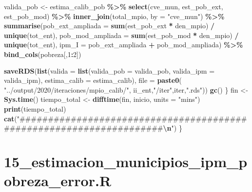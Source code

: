 \documentclass[
  12pt,
]{book}
\newenvironment{Shaded}{\begin{snugshade}}{\end{snugshade}}
\newcommand{\AttributeTok}[1]{\textcolor[rgb]{0.13,0.29,0.53}{#1}}
\newcommand{\DecValTok}[1]{\textcolor[rgb]{0.00,0.00,0.81}{#1}}
\newcommand{\FunctionTok}[1]{\textcolor[rgb]{0.13,0.29,0.53}{\textbf{#1}}}
\newcommand{\NormalTok}[1]{#1}
\newcommand{\OtherTok}[1]{\textcolor[rgb]{0.56,0.35,0.01}{#1}}
\newcommand{\SpecialCharTok}[1]{\textcolor[rgb]{0.81,0.36,0.00}{\textbf{#1}}}
\newcommand{\StringTok}[1]{\textcolor[rgb]{0.31,0.60,0.02}{#1}}
\begin{document}
\begin{Shaded}
\begin{Highlighting}[]
\NormalTok{    valida\_pob }\OtherTok{\textless{}{-}}\NormalTok{ estima\_calib\_pob }\SpecialCharTok{\%\textgreater{}\%} \FunctionTok{select}\NormalTok{(cve\_mun, est\_pob\_ext, est\_pob\_mod) }\SpecialCharTok{\%\textgreater{}\%} 
      \FunctionTok{inner\_join}\NormalTok{(total\_mpio, }\AttributeTok{by =} \StringTok{"cve\_mun"}\NormalTok{) }\SpecialCharTok{\%\textgreater{}\%}
      \FunctionTok{summarise}\NormalTok{(}\AttributeTok{pob\_ext\_ampliada =} \FunctionTok{sum}\NormalTok{(est\_pob\_ext }\SpecialCharTok{*}\NormalTok{ den\_mpio) }\SpecialCharTok{/} \FunctionTok{unique}\NormalTok{(tot\_ent),}
                \AttributeTok{pob\_mod\_ampliada =} \FunctionTok{sum}\NormalTok{(est\_pob\_mod }\SpecialCharTok{*}\NormalTok{ den\_mpio) }\SpecialCharTok{/} \FunctionTok{unique}\NormalTok{(tot\_ent),}
                \AttributeTok{ipm\_I =}\NormalTok{ pob\_ext\_ampliada }\SpecialCharTok{+}\NormalTok{ pob\_mod\_ampliada) }\SpecialCharTok{\%\textgreater{}\%} 
      \FunctionTok{bind\_cols}\NormalTok{(pobreza[,}\DecValTok{1}\SpecialCharTok{:}\DecValTok{2}\NormalTok{])}

    \FunctionTok{saveRDS}\NormalTok{(}\FunctionTok{list}\NormalTok{(}\AttributeTok{valida =} \FunctionTok{list}\NormalTok{(}\AttributeTok{valida\_pob =}\NormalTok{ valida\_pob, }
                               \AttributeTok{valida\_ipm =}\NormalTok{ valida\_ipm),}
                 \AttributeTok{estima\_calib =}\NormalTok{ estima\_calib),}
            \AttributeTok{file =} \FunctionTok{paste0}\NormalTok{( }\StringTok{"../output/2020/iteraciones/mpio\_calib/"}\NormalTok{,}
\NormalTok{                           ii\_ent,}\StringTok{"/iter"}\NormalTok{,iter,}\StringTok{".rds"}\NormalTok{))}
    \FunctionTok{gc}\NormalTok{()}
\NormalTok{  \}}
\NormalTok{  fin }\OtherTok{\textless{}{-}} \FunctionTok{Sys.time}\NormalTok{()}
\NormalTok{  tiempo\_total }\OtherTok{\textless{}{-}} \FunctionTok{difftime}\NormalTok{(fin, inicio, }\AttributeTok{units =} \StringTok{"mins"}\NormalTok{)}
  \FunctionTok{print}\NormalTok{(tiempo\_total)}
  \FunctionTok{cat}\NormalTok{(}\StringTok{"\#\#\#\#\#\#\#\#\#\#\#\#\#\#\#\#\#\#\#\#\#\#\#\#\#\#\#\#\#\#\#\#\#\#\#\#\#\#\#\#\#\#\#\#\#\#\#\#\#\#\#\#\#\#\#\#\#\#\#\#\#\#\#\#\#\#\#\#}\SpecialCharTok{\textbackslash{}n}\StringTok{"}\NormalTok{)}
\NormalTok{\}}
\end{Highlighting}
\end{Shaded}

\hypertarget{estimacion_municipios_ipm_pobreza_error.r}{%
\chapter*{15\_estimacion\_municipios\_ipm\_pobreza\_error.R}\label{estimacion_municipios_ipm_pobreza_error.r}}
\end{document}
